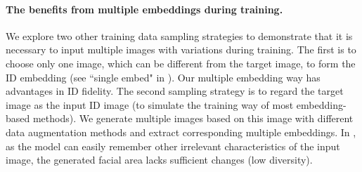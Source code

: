 \paragraph{The benefits from multiple embeddings during training.}
We explore two other training data sampling strategies to demonstrate that it is necessary to input multiple images with variations during training.
The first is to choose only one image, which can be different from the target image, to form the ID embedding (see ``single embed" in ). 
Our multiple embedding way has advantages in ID fidelity.
The second sampling strategy is to regard the target image as the input ID image (to simulate the training way of most embedding-based methods). 
We generate multiple images based on this image with different data augmentation methods and extract corresponding multiple embeddings. 
In , as the model can easily remember other irrelevant characteristics of the input image, the generated facial area lacks sufficient changes (low diversity).





